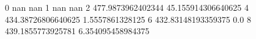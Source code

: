 0 nan nan
1 nan nan
2 477.9873962402344 45.155914306640625
4 434.38726806640625 1.5557861328125
6 432.83148193359375 0.0
8 439.1855773925781 6.354095458984375
